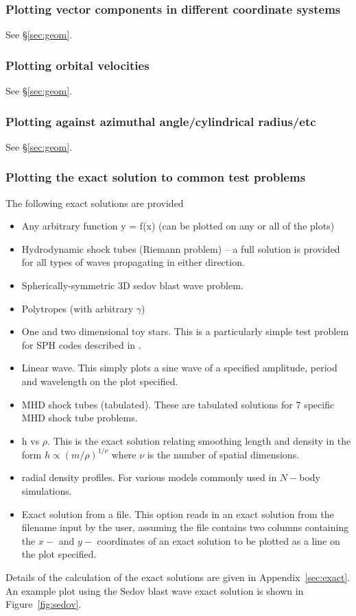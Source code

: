 \documentclass[a4paper,10pt]{article}
\begin{document}
\subsubsection{ Plotting vector components in different coordinate systems}
See \S\ref{sec:geom}.

\subsubsection{ Plotting orbital velocities}
See \S\ref{sec:geom}.

\subsubsection{ Plotting against azimuthal angle/cylindrical radius/etc}
See \S\ref{sec:geom}.

\subsubsection{ Plotting the exact solution to common test problems}
\label{sec:exactsolns}
 The following exact solutions are provided
\begin{itemize}
\item Any arbitrary function y = f(x) (can be plotted on any or all of the plots)
\item Hydrodynamic shock tubes (Riemann problem) -- a full solution is provided for all types of waves propagating in either direction.
\item Spherically-symmetric 3D sedov blast wave problem.
\item Polytropes (with arbitrary $\gamma$)
\item One and two dimensional toy stars. This is a particularly simple test
problem for SPH codes described in \citet{mp04}.
\item Linear wave. This simply plots a sine wave of a specified amplitude, period and
wavelength on the plot specified.
\item MHD shock tubes (tabulated). These are tabulated solutions for 7 specific MHD
shock tube problems.
\item h vs $\rho$. This is the exact solution relating smoothing length and density in
the form $h \propto (m/\rho)^{1/\nu}$ where $\nu$ is the number of spatial dimensions.
\item radial density profiles. For various models commonly used in $N-$body simulations.
\item Exact solution from a file. This option reads in an exact solution from the
filename input by the user, assuming the file contains two columns containing the $x-$ and $y-$ coordinates of
an exact solution to be plotted as a line on the plot specified.
\end{itemize}
Details of the calculation of the exact solutions are given in Appendix~\ref{sec:exact}. An example plot using the Sedov blast wave exact solution is shown in Figure~\ref{fig:sedov}.
\end{document}
